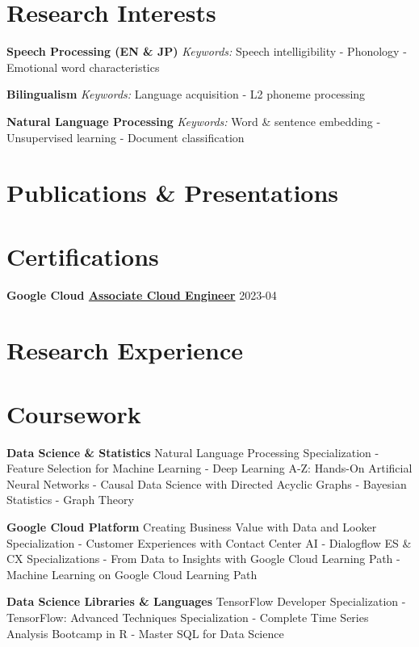 \documentclass[a4paper,9pt]{extarticle}
\begin{document}
\section*{Research Interests}
\noindent\textbf{Speech Processing (EN \& JP)}
\textit{Keywords:} Speech intelligibility - Phonology - Emotional word characteristics

\noindent\textbf{Bilingualism}
\textit{Keywords:} Language acquisition - L2 phoneme processing

\noindent\textbf{Natural Language Processing}
\textit{Keywords:} Word \& sentence embedding - Unsupervised learning - Document classification

\section*{Publications \& Presentations}

\section*{Certifications}
\noindent\textbf{Google Cloud \href{https://google.accredible.com/d3ef369f-9c2c-486a-bda6-943a74f70dff}{Associate Cloud Engineer}}
\hfill2023-04

\section*{Research Experience}

\section*{Coursework}
\noindent\textbf{Data Science \& Statistics}
Natural Language Processing Specialization - Feature Selection for Machine Learning - Deep Learning A-Z: Hands-On Artificial Neural Networks - Causal Data Science with Directed Acyclic Graphs - Bayesian Statistics - Graph Theory

\noindent\textbf{Google Cloud Platform}
Creating Business Value with Data and Looker Specialization - Customer Experiences with Contact Center AI - Dialogflow ES \& CX Specializations - From Data to Insights with Google Cloud Learning Path - Machine Learning on Google Cloud Learning Path

\noindent\textbf{Data Science Libraries \& Languages}
TensorFlow Developer Specialization - TensorFlow: Advanced Techniques Specialization - Complete Time Series Analysis Bootcamp in R - Master SQL for Data Science
\end{document}
